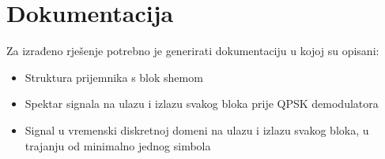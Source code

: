 \documentclass[a4paper]{article}
\begin{document}
\section{Dokumentacija}

Za izrađeno rješenje potrebno je generirati dokumentaciju u kojoj su opisani:
\begin{itemize}
\item Struktura prijemnika s blok shemom
\item Spektar signala na ulazu i izlazu svakog bloka prije QPSK demodulatora
\item Signal u vremenski diskretnoj domeni na ulazu i izlazu svakog bloka, u trajanju od minimalno jednog simbola
\end{itemize}
\end{document}
